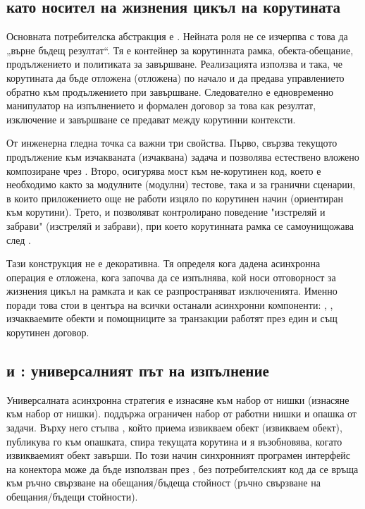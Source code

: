 \subsection{ като носител на жизнения цикъл на корутината}

Основната потребителска абстракция е . Нейната роля не се изчерпва с това да „върне бъдещ резултат“. Тя е контейнер за корутинната рамка, обекта-обещание, продължението и политиката за завършване. Реализацията използва  и  така, че корутината да бъде отложена (отложена) по начало и да предава управлението обратно към продължението при завършване. Следователно  е едновременно манипулатор на изпълнението и формален договор за това как резултат, изключение и завършване се предават между корутинни контексти.

От инженерна гледна точка са важни три свойства. Първо,  свързва текущото продължение към изчакваната (изчаквана) задача и позволява естествено вложено композиране чрез . Второ,  осигурява мост към не-корутинен код, което е необходимо както за модулните (модулни) тестове, така и за гранични сценарии, в които приложението още не работи изцяло по корутинен начин (ориентиран към корутини). Трето,  и  позволяват контролирано поведение "изстреляй и забрави" (изстреляй и забрави), при което корутинната рамка се самоунищожава след .

Тази конструкция не е декоративна. Тя определя кога дадена асинхронна операция е отложена, кога започва да се изпълнява, кой носи отговорност за жизнения цикъл на рамката и как се разпространяват изключенията. Именно поради това  стои в центъра на всички останали асинхронни компоненти: , ,  изчакваемите обекти и помощниците за транзакции работят през един и същ корутинен договор.

\subsection{ и : универсалният път на изпълнение}

Универсалната асинхронна стратегия е изнасяне към набор от нишки (изнасяне към набор от нишки).  поддържа ограничен набор от работни нишки и опашка от задачи. Върху него стъпва , който приема извикваем обект (извикваем обект), публикува го към опашката, спира текущата корутина и я възобновява, когато извикваемият обект завърши. По този начин синхронният програмен интерфейс на конектора може да бъде използван през , без потребителският код да се връща към ръчно свързване на обещания/бъдеща стойност (ръчно свързване на обещания/бъдещи стойности).

